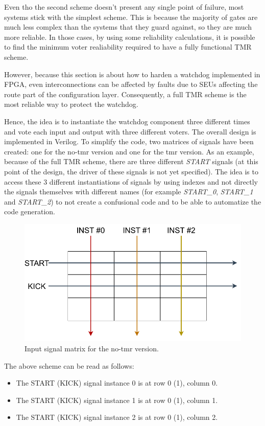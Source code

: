 Even tho the second scheme doesn't present any single point of failure, most systems stick with the simplest scheme. This is because the majority of gates are much less complex than the systems that they guard against, so they are much more reliable. In those cases, by using some reliability calculations, it is possible to find the minimum voter realiability required to have a fully functional TMR scheme. \bigskip

However, because this section is about how to harden a watchdog implemented in FPGA, even interconnections can be affected by faults due to SEUs affecting the route part of the configuration layer. Consequently, a full TMR scheme is the most reliable way to protect the watchdog.\bigskip

Hence, the idea is to instantiate the watchdog component three different times and vote each input and output with three different voters. The overall design is implemented in Verilog. To simplify the code, two matrices of signals have been created: one for the no-tmr version and one for the tmr version. As an example, because of the full TMR scheme, there are three different \textit{START} signals (at this point of the design, the driver of these signals is not yet specified). The idea is to access these 3 different instantiations of signals by using indexes and not directly the signals themselves with different names (for example \textit{START_0}, \textit{START_1} and \textit{START_2}) to not create a confusional code and to be able to automatize the code generation.

\begin{figure}[H]
\centering
\includegraphics[width=0.8\linewidth]{images/chapter4/mtx_notmr.pdf}
\caption{Input signal matrix for the no-tmr version.}
\label{fig:mtx_notmr}
\end{figure}

The above scheme can be read as follows:
\begin{itemize}
    \item The START (KICK) signal instance 0 is at row 0 (1), column 0.
    \item The START (KICK) signal instance 1 is at row 0 (1), column 1.
    \item The START (KICK) signal instance 2 is at row 0 (1), column 2.
\end{itemize}

